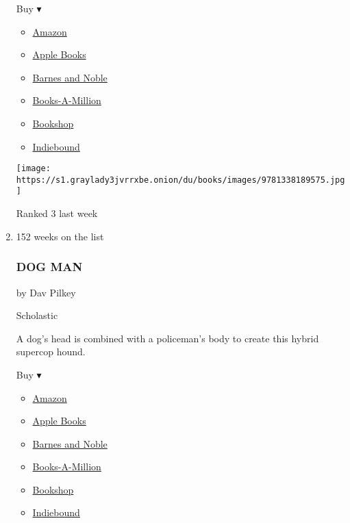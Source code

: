 \begin{enumerate}
  Buy ▾

  \begin{itemize}
  \tightlist
  \item
    \href{https://www.amazon.com/Bad-Guys-Intergalactic-Gas/dp/1338189573?tag=NYTBS-20}{Amazon}
  \item
    \href{https://du-gae-books-dot-nyt-du-prd.appspot.com/buy?title=THE+BAD+GUYS\&author=Aaron+Blabey}{Apple
    Books}
  \item
    \href{https://www.anrdoezrs.net/click-7990613-11819508?url=https\%3A\%2F\%2Fwww.barnesandnoble.com\%2Fw\%2F\%3Fean\%3D9781338329483}{Barnes
    and Noble}
  \item
    \href{https://www.anrdoezrs.net/click-7990613-35140?url=https\%3A\%2F\%2Fwww.booksamillion.com\%2Fp\%2FTHE\%2BBAD\%2BGUYS\%2FAaron\%2BBlabey\%2F9781338329483}{Books-A-Million}
  \item
    \href{https://bookshop.org/a/3546/9781338329483}{Bookshop}
  \item
    \href{https://www.indiebound.org/book/9781338329483?aff=NYT}{Indiebound}
  \end{itemize}

  \texttt{[image: https://s1.graylady3jvrrxbe.onion/du/books/images/9781338189575.jpg]}

  Ranked 3 last week
\item
  152 weeks on the list

  \hypertarget{dog-man}{%
  \subsubsection{DOG MAN}\label{dog-man}}

  by Dav Pilkey

  Scholastic

  A dog's head is combined with a policeman's body to create this hybrid
  supercop hound.

  Buy ▾

  \begin{itemize}
  \tightlist
  \item
    \href{https://www.amazon.com/Dog-Man-Kitties-Creator-Underpants/dp/0545935210?tag=NYTBS-20}{Amazon}
  \item
    \href{https://du-gae-books-dot-nyt-du-prd.appspot.com/buy?title=DOG+MAN\&author=Dav+Pilkey}{Apple
    Books}
  \item
    \href{https://www.anrdoezrs.net/click-7990613-11819508?url=https\%3A\%2F\%2Fwww.barnesandnoble.com\%2Fw\%2F\%3Fean\%3D9781338323214}{Barnes
    and Noble}
  \item
    \href{https://www.anrdoezrs.net/click-7990613-35140?url=https\%3A\%2F\%2Fwww.booksamillion.com\%2Fp\%2FDOG\%2BMAN\%2FDav\%2BPilkey\%2F9781338323214}{Books-A-Million}
  \item
    \href{https://bookshop.org/a/3546/9781338323214}{Bookshop}
  \item
    \href{https://www.indiebound.org/book/9781338323214?aff=NYT}{Indiebound}
  \end{itemize}


\end{enumerate}
